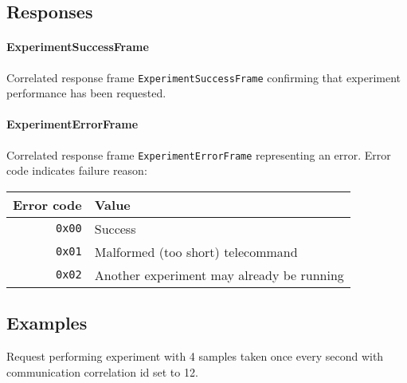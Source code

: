 \begin{tcarglist}
\end{tcarglist}

\subsection{Responses}
\paragraph{ExperimentSuccessFrame}

Correlated response frame \texttt{ExperimentSuccessFrame} confirming 
that \detumbling experiment performance has been requested.

\paragraph{ExperimentErrorFrame}
Correlated response frame \texttt{ExperimentErrorFrame} representing an error. 
Error code indicates failure reason:

\begin{tabular}{r | l}
    Error code & Value \\
    \hline
    \texttt{0x00}   & Success \\
    \texttt{0x01}   & Malformed (too short) telecommand \\
    \texttt{0x02}   & Another experiment may already be running \\
\end{tabular}

\subsection{Examples}
Request performing \detumbling experiment with 4 samples taken once every second with communication correlation id set to 12.


